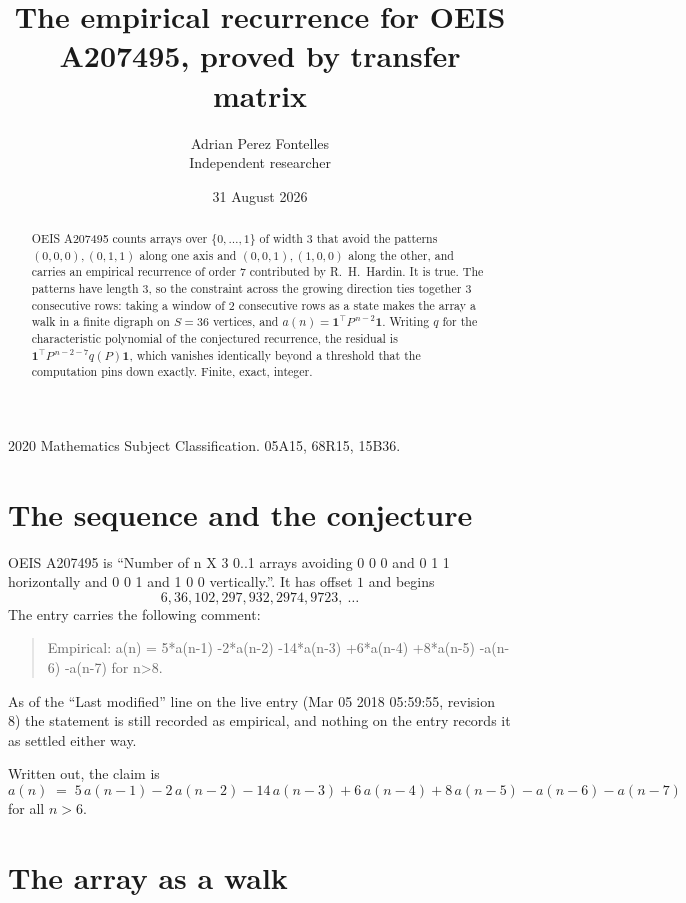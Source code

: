 \documentclass[11pt,a4paper]{article}
\title{The empirical recurrence for OEIS A207495, proved by transfer matrix}
\author{Adrian Perez Fontelles\\ \small Independent researcher}
\date{31 August 2026}
\theoremstyle{plain}
\theoremstyle{definition}
\begin{document}
\maketitle

\begin{abstract}
OEIS A207495 counts arrays over $\{0,\dots,1\}$ of width $3$ that avoid the patterns
$(0,0,0), (0,1,1)$ along one axis and $(0,0,1), (1,0,0)$ along the other, and carries an empirical recurrence of
order $7$ contributed by R.~H.~Hardin. It is true. The patterns have length $3$, so
the constraint across the growing direction ties together $3$ consecutive rows: taking a
window of $2$ consecutive rows as a state makes the array a walk in a finite digraph
on $S=36$ vertices, and $a(n)=\mathbf{1}^{\!\top}P^{\,n-2}\mathbf{1}$. Writing $q$
for the characteristic polynomial of the conjectured recurrence, the residual is
$\mathbf{1}^{\!\top}P^{\,n-2-7}q(P)\mathbf{1}$, which vanishes identically
beyond a threshold that the computation pins down exactly. Finite, exact, integer.
\end{abstract}

\noindent\small 2020 Mathematics Subject Classification. 05A15, 68R15, 15B36.\normalsize

\section{The sequence and the conjecture}

OEIS A207495 is ``Number of n X 3 0..1 arrays avoiding 0 0 0 and 0 1 1 horizontally and 0 0 1 and 1 0 0 vertically.''. It has offset
$1$ and begins
\[
6, 36, 102, 297, 932, 2974, 9723,\ \dots
\]
The entry carries the following comment:
\begin{quote}\small
Empirical: a(n) = 5*a(n-1) -2*a(n-2) -14*a(n-3) +6*a(n-4) +8*a(n-5) -a(n-6) -a(n-7) for n>8.
\end{quote}
As of the ``Last modified'' line on the live entry (Mar 05 2018 05:59:55, revision
8) the statement is still recorded as empirical, and nothing on the entry
records it as settled either way.

Written out, the claim is
\begin{equation}\label{eq:conj}
a(n)\;=\;5\,a(n-1) - 2\,a(n-2) - 14\,a(n-3) + 6\,a(n-4) + 8\,a(n-5) - a(n-6) - a(n-7)
\end{equation}
for all $n>6$. 

\section{The array as a walk}
\end{document}
